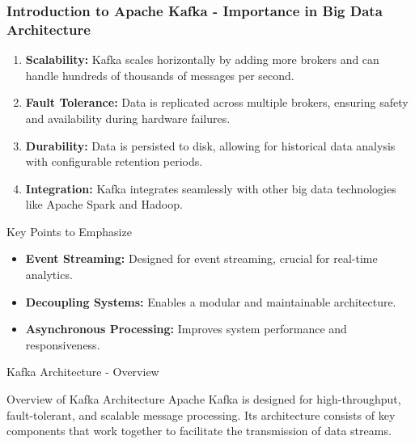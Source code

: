 \documentclass[aspectratio=169]{beamer}
\begin{document}
\begin{frame}[fragile]
    \frametitle{Introduction to Apache Kafka - Importance in Big Data Architecture}
    \begin{enumerate}
        \item \textbf{Scalability:} Kafka scales horizontally by adding more brokers and can handle hundreds of thousands of messages per second.
        \item \textbf{Fault Tolerance:} Data is replicated across multiple brokers, ensuring safety and availability during hardware failures.
        \item \textbf{Durability:} Data is persisted to disk, allowing for historical data analysis with configurable retention periods.
        \item \textbf{Integration:} Kafka integrates seamlessly with other big data technologies like Apache Spark and Hadoop.
    \end{enumerate}
    
    \begin{block}{Key Points to Emphasize}
        \begin{itemize}
            \item \textbf{Event Streaming:} Designed for event streaming, crucial for real-time analytics.
            \item \textbf{Decoupling Systems:} Enables a modular and maintainable architecture.
            \item \textbf{Asynchronous Processing:} Improves system performance and responsiveness.
        \end{itemize}
    \end{block}
    
\end{frame}

\begin{frame}[fragile]{Kafka Architecture - Overview}
    \begin{block}{Overview of Kafka Architecture}
        Apache Kafka is designed for high-throughput, fault-tolerant, and scalable message processing. Its architecture consists of key components that work together to facilitate the transmission of data streams.
    \end{block}
\end{frame}
\end{document}
